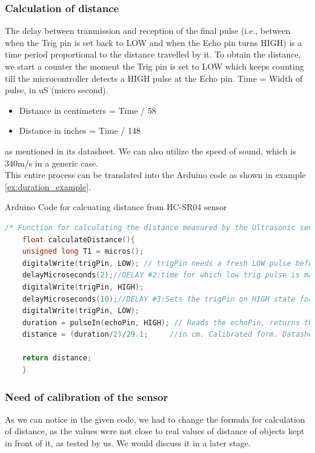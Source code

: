 \subsubsection{Calculation of distance}
The delay between tranmission and reception of the final pulse (i.e., between when the Trig pin is set back to LOW and when the Echo pin turns HIGH) is a time period proportional to the distance travelled by it. To obtain the distance, we start a counter the moment the Trig pin is set to LOW which keeps counting till the microcontroller detects a HIGH pulse at the Echo pin.
Time = Width of pulse, in uS (micro second).
\begin{itemize}
	\item Distance in centimeters = Time / 58
	\item Distance in inches = Time / 148
\end{itemize}
as mentioned in its datasheet. We can also utilize the speed of sound, which is 340m/s in a generic case.\\
This entire process can be translated into the Arduino code as shown in example \ref{ex:duration_example}.
\begin{example}{Arduino Code for calcuating distance from HC-SR04 sensor}
\label{ex:duration_example}
\begin{mdframed}[backgroundcolor=light-gray, roundcorner=10pt,leftmargin=1, rightmargin=1, innerleftmargin=15, innertopmargin=15,innerbottommargin=15, outerlinewidth=1, linecolor=light-gray]
	\begin{lstlisting}[language = C]
	/* Function for calculating the distance measured by the Ultrasonic sensor*/
	float calculateDistance(){ 
	unsigned long T1 = micros();
	digitalWrite(trigPin, LOW); // trigPin needs a fresh LOW pulse before sending a HIGH pulse that can be detected from echoPin
	delayMicroseconds(2);//DELAY #2:time for which low trig pulse is maintained before making it high
	digitalWrite(trigPin, HIGH); 
	delayMicroseconds(10);//DELAY #3:Sets the trigPin on HIGH state for 10 micro seconds
	digitalWrite(trigPin, LOW);
	duration = pulseIn(echoPin, HIGH); // Reads the echoPin, returns the sound wave travel time in microseconds
	distance = (duration/2)/29.1;     //in cm. Calibrated form. Datasheet shows "duration/58" as the formula
	
	return distance;
	}
	\end{lstlisting}
	
\end{mdframed}
\end{example}
\subsubsection{Need of calibration of the sensor}
As we can notice in the given code, we had to change the formula for calculation of distance, as the values were not close to real values of distance of objects kept in front of it, as tested by us. We would discuss it in a later stage.
